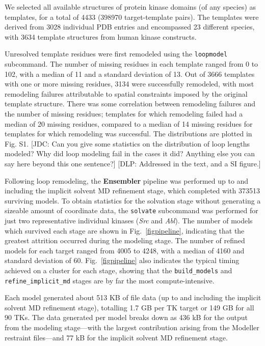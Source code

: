 \documentclass[aps,pre,twocolumn,nofootinbib,superscriptaddress,linenumbers]{revtex4-1}
\begin{document}
We selected all available structures of protein kinase domains (of any species) as templates, for a total of 4433 (\num{398970} target-template pairs).
The templates were derived from 3028 individual PDB entries and encompassed 23 different species, with 3634 template structures from human kinase constructs.

Unresolved template residues were first remodeled using the {\tt loopmodel} subcommand.
The number of missing residues in each template ranged from 0 to 102, with a median of 11 and a standard deviation of 13.
Out of 3666 templates with one or more missing residues, 3134 were successfully remodeled, with most remodeling failures attributable to spatial constraints imposed by the original template structure.
There was some correlation between remodeling failures and the number of missing residues; templates for which remodeling failed had a median of 20 missing residues, compared to a median of 14 missing residues for templates for which remodeling was successful.
The distributions are plotted in Fig. S1.
{\color{red}[JDC: Can you give some statistics on the distribution of loop lengths modeled?  Why did loop modeling fail in the cases it did?  Anything else you can say here beyond this one sentence?]}
{\color{blue}[DLP: Addressed in the text, and a SI figure.]}

Following loop remodeling, the {\bf Ensembler} pipeline was performed up to and including the implicit solvent MD refinement stage, which completed with \num{373513} surviving models.
To obtain statistics for the solvation stage without generating a sizeable amount of coordinate data, the {\tt solvate} subcommand was performed for just two representative individual kinases (\emph{Src} and \emph{Abl}).
The number of models which survived each stage are shown in Fig.~\ref{figpipeline}, indicating that the greatest attrition occurred during the modeling stage.
The number of refined models for each target ranged from 4005 to 4248, with a median of 4160 and standard deviation of 60.
Fig.~\ref{figpipeline} also indicates the typical timing achieved on a cluster for each stage, showing that the {\tt build\_models} and {\tt refine\_implicit\_md} stages are by far the most compute-intensive.

Each model generated about 513 KB of file data (up to and including the implicit solvent MD refinement stage), totalling 1.7 GB per TK target or 149 GB for all 90 TKs.
The data generated per model breaks down as 436 kB for the output from the modeling stage---with the largest contribution arising from the Modeller restraint files---and 77 kB for the implicit solvent MD refinement stage.
\end{document}
